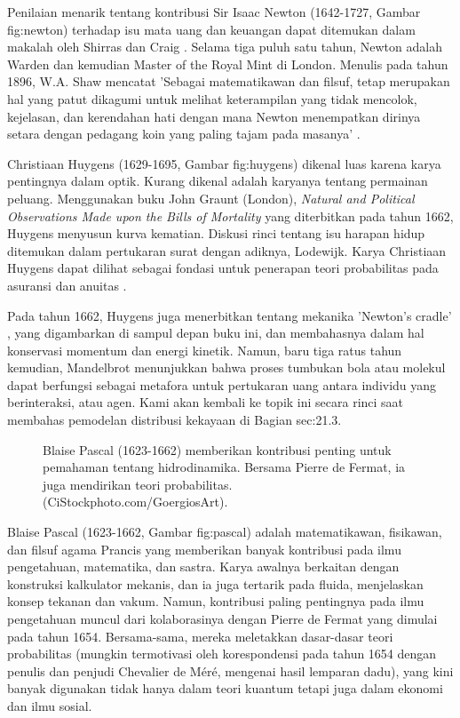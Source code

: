 \documentclass[a4paper,12pt]{book}
\begin{document}
Penilaian menarik tentang kontribusi Sir Isaac Newton (1642-1727, Gambar  {fig:newton}) terhadap isu mata uang dan keuangan dapat ditemukan dalam makalah oleh Shirras dan Craig \cite{shirras1945}. Selama tiga puluh satu tahun, Newton adalah Warden dan kemudian Master of the Royal Mint di London. Menulis pada tahun 1896, W.A. Shaw mencatat 'Sebagai matematikawan dan filsuf, tetap merupakan hal yang patut dikagumi untuk melihat keterampilan yang tidak mencolok, kejelasan, dan kerendahan hati dengan mana Newton menempatkan dirinya setara dengan pedagang koin yang paling tajam pada masanya' \cite{shaw1896}.


Christiaan Huygens (1629-1695, Gambar  {fig:huygens}) dikenal luas karena karya pentingnya dalam optik. Kurang dikenal adalah karyanya tentang permainan peluang. Menggunakan buku John Graunt (London), \textit{Natural and Political Observations Made upon the Bills of Mortality} yang diterbitkan pada tahun 1662, Huygens menyusun kurva kematian. Diskusi rinci tentang isu harapan hidup ditemukan dalam pertukaran surat dengan adiknya, Lodewijk. Karya Christiaan Huygens dapat dilihat sebagai fondasi untuk penerapan teori probabilitas pada asuransi dan anuitas \cite{dahlke1989}.

Pada tahun 1662, Huygens juga menerbitkan tentang mekanika 'Newton's cradle' \cite{hutzler2004}, yang digambarkan di sampul depan buku ini, dan membahasnya dalam hal konservasi momentum dan energi kinetik. Namun, baru tiga ratus tahun kemudian, Mandelbrot menunjukkan bahwa proses tumbukan bola atau molekul dapat berfungsi sebagai metafora untuk pertukaran uang antara individu yang berinteraksi, atau agen. Kami akan kembali ke topik ini secara rinci saat membahas pemodelan distribusi kekayaan di Bagian  {sec:21.3}.

\begin{figure}[h]
\centering
\caption{Blaise Pascal (1623-1662) memberikan kontribusi penting untuk pemahaman tentang hidrodinamika. Bersama Pierre de Fermat, ia juga mendirikan teori probabilitas. (CiStockphoto.com/GoergiosArt).}
\label{fig:pascal}
\end{figure}

Blaise Pascal (1623-1662, Gambar  {fig:pascal}) adalah matematikawan, fisikawan, dan filsuf agama Prancis yang memberikan banyak kontribusi pada ilmu pengetahuan, matematika, dan sastra. Karya awalnya berkaitan dengan konstruksi kalkulator mekanis, dan ia juga tertarik pada fluida, menjelaskan konsep tekanan dan vakum. Namun, kontribusi paling pentingnya pada ilmu pengetahuan muncul dari kolaborasinya dengan Pierre de Fermat yang dimulai pada tahun 1654. Bersama-sama, mereka meletakkan dasar-dasar teori probabilitas (mungkin termotivasi oleh korespondensi pada tahun 1654 dengan penulis dan penjudi Chevalier de Méré, mengenai hasil lemparan dadu), yang kini banyak digunakan tidak hanya dalam teori kuantum tetapi juga dalam ekonomi dan ilmu sosial.
\end{document}
